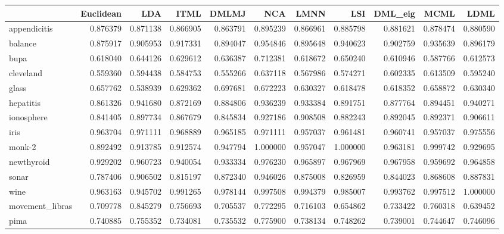 \begin{tabular}{lrrrrrrrrrr}
\toprule
{} &  Euclidean &       LDA &      ITML &     DMLMJ &       NCA &      LMNN &       LSI &   DML\_eig &      MCML &      LDML \\
\midrule
appendicitis    &   0.876379 &  0.871138 &  0.866905 &  0.863791 &  0.895239 &  0.866961 &  0.885798 &  0.881621 &  0.878474 &  0.880590 \\
balance         &   0.875917 &  0.905953 &  0.917331 &  0.894047 &  0.954846 &  0.895648 &  0.940623 &  0.902759 &  0.935639 &  0.896179 \\
bupa            &   0.618040 &  0.644126 &  0.629612 &  0.636387 &  0.712381 &  0.618672 &  0.650240 &  0.610946 &  0.587766 &  0.612573 \\
cleveland       &   0.559360 &  0.594438 &  0.584753 &  0.555266 &  0.637118 &  0.567986 &  0.574271 &  0.602335 &  0.613509 &  0.595240 \\
glass           &   0.657762 &  0.538939 &  0.629362 &  0.697681 &  0.672223 &  0.630327 &  0.618478 &  0.618352 &  0.658872 &  0.630340 \\
hepatitis       &   0.861326 &  0.941680 &  0.872169 &  0.884806 &  0.936239 &  0.933384 &  0.891751 &  0.877764 &  0.894451 &  0.940271 \\
ionosphere      &   0.841405 &  0.897734 &  0.867679 &  0.845834 &  0.927186 &  0.908508 &  0.882243 &  0.892045 &  0.892371 &  0.906611 \\
iris            &   0.963704 &  0.971111 &  0.968889 &  0.965185 &  0.971111 &  0.957037 &  0.961481 &  0.960741 &  0.957037 &  0.975556 \\
monk-2          &   0.892492 &  0.913785 &  0.912574 &  0.947794 &  1.000000 &  0.957047 &  1.000000 &  0.963181 &  0.999742 &  0.929695 \\
newthyroid      &   0.929202 &  0.960723 &  0.940054 &  0.933334 &  0.976230 &  0.965897 &  0.967969 &  0.967958 &  0.959692 &  0.964858 \\
sonar           &   0.787406 &  0.906502 &  0.815197 &  0.872340 &  0.946026 &  0.875008 &  0.826959 &  0.844023 &  0.868608 &  0.887831 \\
wine            &   0.963163 &  0.945702 &  0.991265 &  0.978144 &  0.997508 &  0.994379 &  0.985007 &  0.993762 &  0.997512 &  1.000000 \\
movement\_libras &   0.709778 &  0.845279 &  0.756693 &  0.705537 &  0.772295 &  0.716103 &  0.654862 &  0.733422 &  0.760318 &  0.639452 \\
pima            &   0.740885 &  0.755352 &  0.734081 &  0.735532 &  0.775900 &  0.738134 &  0.748262 &  0.739001 &  0.744647 &  0.746096 \\

\end{tabular}
